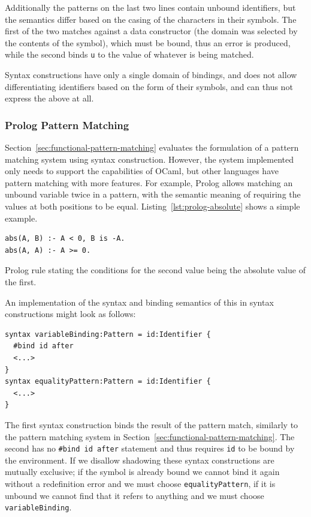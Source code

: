 \documentclass{kththesis}
\begin{document}
Additionally the patterns on the last two lines contain unbound identifiers, but the semantics differ based on the casing of the characters in their symbols. The first of the two matches against a data constructor (the domain was selected by the contents of the symbol), which must be bound, thus an error is produced, while the second binds \texttt{u} to the value of whatever is being matched.

Syntax constructions have only a single domain of bindings, and does not allow differentiating identifiers based on the form of their symbols, and can thus not express the above at all.

\subsubsection{Prolog Pattern Matching} \label{sec:prolog-pattern-matching}

Section~\ref{sec:functional-pattern-matching} evaluates the formulation of a pattern matching system using syntax construction. However, the system implemented only needs to support the capabilities of OCaml, but other languages have pattern matching with more features. For example, Prolog allows matching an unbound variable twice in a pattern, with the semantic meaning of requiring the values at both positions to be equal. Listing~\ref{lst:prolog-absolute} shows a simple example.

\begin{listing}[h]
\begin{verbatim}
abs(A, B) :- A < 0, B is -A.
abs(A, A) :- A >= 0.
\end{verbatim}
\caption{Prolog rule stating the conditions for the second value being the absolute value of the first.}
\label{lst:prolog-absolute}
\end{listing}

An implementation of the syntax and binding semantics of this in syntax constructions might look as follows:

\begin{verbatim}
syntax variableBinding:Pattern = id:Identifier {
  #bind id after
  <...>
}
syntax equalityPattern:Pattern = id:Identifier {
  <...>
}
\end{verbatim}

The first syntax construction binds the result of the pattern match, similarly to the pattern matching system in Section~\ref{sec:functional-pattern-matching}. The second has no \texttt{#bind id after} statement and thus requires \texttt{id} to be bound by the environment. If we disallow shadowing these syntax constructions are mutually exclusive; if the symbol is already bound we cannot bind it again without a redefinition error and we must choose \texttt{equalityPattern}, if it is unbound we cannot find that it refers to anything and we must choose \texttt{variableBinding}.
\end{document}
